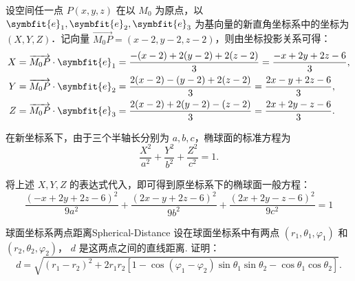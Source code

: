 \begin{solution}
    设空间任一点 $P(x, y, z)$ 在以 $M_0$ 为原点，以 $\symbfit{e}_1, \symbfit{e}_2, \symbfit{e}_3$ 为基向量的新直角坐标系中的坐标为 $(X,\allowbreak Y,\allowbreak Z)$．记向量 $\overrightarrow{M_0 P} = (x - 2, y - 2, z - 2)$，则由坐标投影关系可得：
    \begin{equation}
        \begin{aligned}
            X & = \overrightarrow{M_0 P} \cdot \symbfit{e}_1 = \frac{-(x - 2) + 2(y - 2) + 2(z - 2)}{3} = \frac{-x + 2y + 2z - 6}{3}, \\
            Y & = \overrightarrow{M_0 P} \cdot \symbfit{e}_2 = \frac{2(x - 2) - (y - 2) + 2(z - 2)}{3} = \frac{2x - y + 2z - 6}{3},   \\
            Z & = \overrightarrow{M_0 P} \cdot \symbfit{e}_3 = \frac{2(x - 2) + 2(y - 2) - (z - 2)}{3} = \frac{2x + 2y - z - 6}{3}.
        \end{aligned}
    \end{equation}

    在新坐标系下，由于三个半轴长分别为 $a, b, c$，椭球面的标准方程为
    \begin{equation}
        \frac{X^2}{a^2} + \frac{Y^2}{b^2} + \frac{Z^2}{c^2} = 1.
    \end{equation}

    将上述 $X, Y, Z$ 的表达式代入，即可得到原坐标系下的椭球面一般方程：
    \begin{equation}
        \boxed{\frac{(-x + 2y + 2z - 6)^2}{9a^2} + \frac{(2x - y + 2z - 6)^2}{9b^2} + \frac{(2x + 2y - z - 6)^2}{9c^2} = 1}
    \end{equation}
\end{solution}


\begin{problem}{球面坐标系两点距离}{Spherical-Distance}
    设在球面坐标系中有两点 $(r_1, \theta_1, \varphi_1)$ 和 $(r_2, \theta_2, \varphi_2)$， $d$ 是这两点之间的直线距离. 证明：
    \begin{equation}
        d = \sqrt{(r_1 - r_2)^2 + 2r_1 r_2 [1 - \cos(\varphi_1 - \varphi_2) \sin\theta_1 \sin\theta_2 - \cos\theta_1 \cos\theta_2]}.
    \end{equation}
\end{problem}

